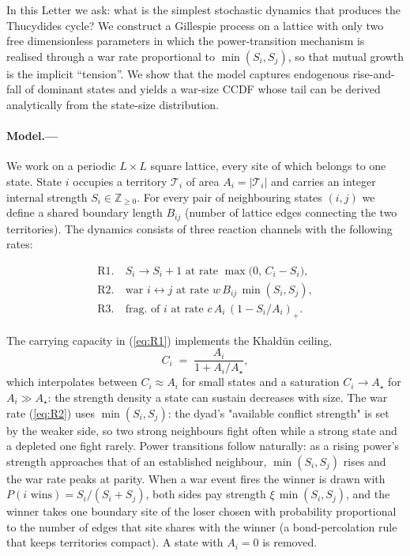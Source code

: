 \documentclass[10pt,twocolumn]{article}
\begin{document}
In this Letter we ask: what is the simplest stochastic dynamics that
produces the Thucydides cycle? We construct a Gillespie process on a
lattice with only two free dimensionless parameters in which the
power-transition mechanism is realised through a war rate proportional
to $\min(S_i,S_j)$, so that mutual growth is the implicit
``tension''. We show that the model captures endogenous rise-and-fall
of dominant states and yields a war-size CCDF whose tail can be derived
analytically from the state-size distribution.

\paragraph*{Model.---}
We work on a periodic $L\times L$ square lattice, every site of which
belongs to one state. State $i$ occupies a territory $\mathcal{T}_i$ of
area $A_i = |\mathcal{T}_i|$ and carries an integer internal strength
$S_i \in \mathbb{Z}_{\ge 0}$. For every pair of neighbouring states
$(i,j)$ we define a shared boundary length $B_{ij}$ (number of lattice
edges connecting the two territories).
The dynamics consists of three reaction channels with the following rates:

\begin{align}
\text{R1.}\ &S_i \to S_i + 1 \text{ at rate }
\max\!\bigl(0,\, C_i - S_i\bigr),
\label{eq:R1}\\
\text{R2.}\ &\text{war } i\!\leftrightarrow\!j \text{ at rate }
w\, B_{ij}\,\min(S_i,S_j),
\label{eq:R2}\\
\text{R3.}\ &\text{frag.\ of } i \text{ at rate } c\, A_i\,(1-S_i/A_i)_+. \label{eq:R3}
\end{align}

The carrying capacity in (\ref{eq:R1}) implements the Khald\=un ceiling,
\begin{equation}
C_i \;=\; \frac{A_i}{1+A_i/A_\star},
\label{eq:capacity}
\end{equation}
which interpolates between $C_i\!\approx\! A_i$ for small states and a
saturation $C_i\!\to\!A_\star$ for $A_i\gg A_\star$: the strength
density a state can sustain decreases with size. The war rate
(\ref{eq:R2}) uses $\min(S_i,S_j)$: the dyad's "available conflict
strength" is set by the weaker side, so two strong neighbours fight
often while a strong state and a depleted one fight rarely. Power
transitions follow naturally: as a rising power's strength approaches
that of an established neighbour, $\min(S_i,S_j)$ rises and the war rate
peaks at parity. When a war event fires the winner is drawn with
$P(i\text{ wins}) = S_i/(S_i+S_j)$, both sides pay strength
$\xi\,\min(S_i,S_j)$, and the winner takes one boundary site of the
loser chosen with probability proportional to the number of edges that
site shares with the winner (a bond-percolation rule that keeps
territories compact). A state with $A_i=0$ is removed.
\end{document}
